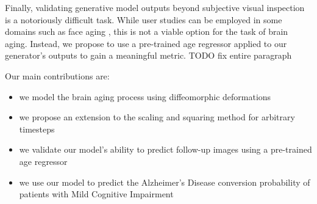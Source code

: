 Finally, validating generative model outputs beyond subjective visual inspection is a notoriously difficult task. While user studies can be employed in some domains such as face aging \cite{palsson2018generative}, this is not a viable option for the task of brain aging. Instead, we propose to use a pre-trained age regressor applied to our generator's outputs to gain a meaningful metric. TODO fix entire paragraph

Our main contributions are:

\begin{itemize}
	\item we model the brain aging process using diffeomorphic deformations%
	\item we propose an extension to the scaling and squaring method for arbitrary timesteps
	\item we validate our model's ability to predict follow-up images using a pre-trained age regressor
	\item we use our model to predict the Alzheimer's Disease conversion probability of patients with Mild Cognitive Impairment
\end{itemize}

